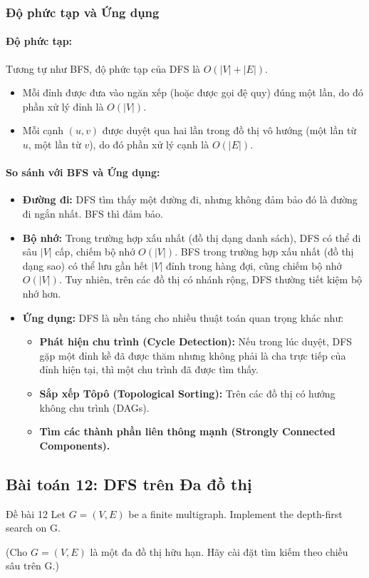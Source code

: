 \documentclass[a4paper,12pt]{article}
\begin{document}
\subsubsection{Độ phức tạp và Ứng dụng}
\paragraph{Độ phức tạp:} Tương tự như BFS, độ phức tạp của DFS là $O(|V| + |E|)$.
\begin{itemize}
    \item Mỗi đỉnh được đưa vào ngăn xếp (hoặc được gọi đệ quy) đúng một lần, do đó phần xử lý đỉnh là $O(|V|)$.
    \item Mỗi cạnh $(u, v)$ được duyệt qua hai lần trong đồ thị vô hướng (một lần từ $u$, một lần từ $v$), do đó phần xử lý cạnh là $O(|E|)$.
\end{itemize}

\paragraph{So sánh với BFS và Ứng dụng:}
\begin{itemize}
    \item \textbf{Đường đi:} DFS tìm thấy một đường đi, nhưng không đảm bảo đó là đường đi ngắn nhất. BFS thì đảm bảo.
    \item \textbf{Bộ nhớ:} Trong trường hợp xấu nhất (đồ thị dạng danh sách), DFS có thể đi sâu $|V|$ cấp, chiếm bộ nhớ $O(|V|)$. BFS trong trường hợp xấu nhất (đồ thị dạng sao) có thể lưu gần hết $|V|$ đỉnh trong hàng đợi, cũng chiếm bộ nhớ $O(|V|)$. Tuy nhiên, trên các đồ thị có nhánh rộng, DFS thường tiết kiệm bộ nhớ hơn.
    \item \textbf{Ứng dụng:} DFS là nền tảng cho nhiều thuật toán quan trọng khác như:
        \begin{itemize}
            \item \textbf{Phát hiện chu trình (Cycle Detection):} Nếu trong lúc duyệt, DFS gặp một đỉnh kề đã được thăm nhưng không phải là cha trực tiếp của đỉnh hiện tại, thì một chu trình đã được tìm thấy.
            \item \textbf{Sắp xếp Tôpô (Topological Sorting):} Trên các đồ thị có hướng không chu trình (DAGs).
            \item \textbf{Tìm các thành phần liên thông mạnh (Strongly Connected Components).}
        \end{itemize}
\end{itemize}


\subsection{Bài toán 12: DFS trên Đa đồ thị}
\begin{problembox}{Đề bài 12}
    Let $G = (V,E)$ be a finite multigraph. Implement the depth-first search on G.
    
    (Cho $G = (V,E)$ là một đa đồ thị hữu hạn. Hãy cài đặt tìm kiếm theo chiều sâu trên G.)
\end{problembox}
\end{document}
